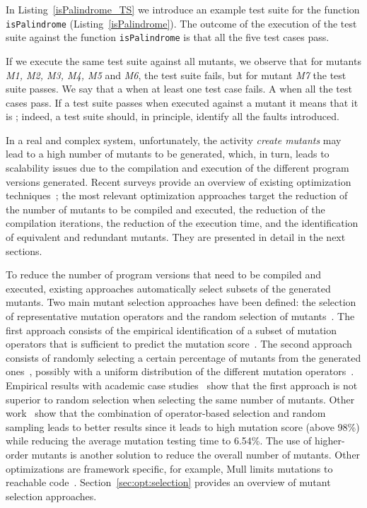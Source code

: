 In Listing~\ref{isPalindrome_TS} we introduce an example test suite for the function \texttt{isPalindrome} (Listing~\ref{isPalindrome}). 
The outcome of the execution of the test suite against the function \texttt{isPalindrome} is that all the five test cases pass.

If we execute the same test suite against all mutants, we observe that for mutants \textit{M1, M2, M3, M4, M5} and \textit{M6}, the test suite fails, but for mutant \textit{M7} the test suite passes. We say that a  when at least one test case fails. A  when all the test cases pass. If a test suite passes when executed against a mutant it means that it is ; indeed, a test suite should, in principle, identify all the faults introduced.

In a real and complex system, unfortunately, the activity \emph{create mutants} may lead to a high number of mutants to be generated, which, in turn, leads to scalability issues due to the compilation and execution of the different program versions generated. Recent surveys provide an overview of existing optimization techniques~\cite{ferrari2018systematic};
the most relevant optimization approaches target the reduction of the number of mutants to be compiled and executed, 
the reduction of the compilation iterations, the reduction of the execution time, and the identification of equivalent and redundant mutants. They are presented in detail in the next sections.

To reduce the number of program versions that need to be compiled and executed, existing approaches automatically select subsets of the generated mutants. Two main mutant selection approaches have been defined: the selection of representative mutation operators and the random selection of mutants~\cite{zhang2010operator}. The first approach consists of the empirical identification of a subset of mutation operators that is sufficient to predict the mutation score~\cite{siami2008sufficient,barbosa2001toward}. The second approach consists of randomly selecting a certain percentage of mutants from the generated ones~\cite{wong1995reducing}, possibly with a uniform distribution of the different mutation operators~\cite{zhang2010operator}. Empirical results with academic case studies~\cite{zhang2010operator} show that the first approach is not superior to random selection when selecting the same number of mutants. Other work~\cite{zhang2013operator} show that the combination of operator-based selection and random sampling leads to better results since it leads to high mutation score (above 98\%) while reducing the average mutation testing time to 6.54\%. The use of higher-order mutants is another solution to reduce the overall number of mutants. 
Other optimizations are framework specific, for example, Mull limits mutations to reachable code~\cite{hariri2018srciror}. Section~\ref{sec:opt:selection} provides an overview of mutant selection approaches.

